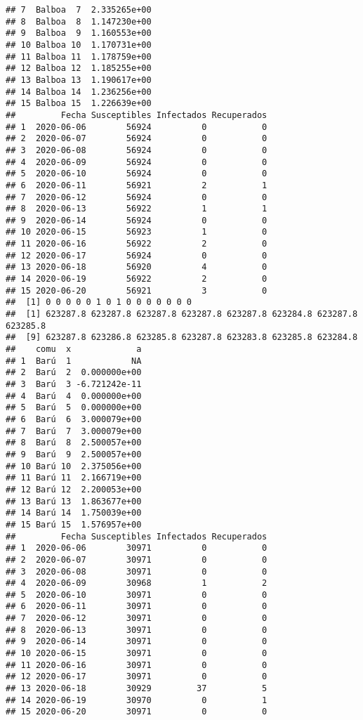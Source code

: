 \documentclass[
]{article}
\begin{document}
\begin{verbatim}
## 7  Balboa  7  2.335265e+00
## 8  Balboa  8  1.147230e+00
## 9  Balboa  9  1.160553e+00
## 10 Balboa 10  1.170731e+00
## 11 Balboa 11  1.178759e+00
## 12 Balboa 12  1.185255e+00
## 13 Balboa 13  1.190617e+00
## 14 Balboa 14  1.236256e+00
## 15 Balboa 15  1.226639e+00
##         Fecha Susceptibles Infectados Recuperados
## 1  2020-06-06        56924          0           0
## 2  2020-06-07        56924          0           0
## 3  2020-06-08        56924          0           0
## 4  2020-06-09        56924          0           0
## 5  2020-06-10        56924          0           0
## 6  2020-06-11        56921          2           1
## 7  2020-06-12        56924          0           0
## 8  2020-06-13        56922          1           1
## 9  2020-06-14        56924          0           0
## 10 2020-06-15        56923          1           0
## 11 2020-06-16        56922          2           0
## 12 2020-06-17        56924          0           0
## 13 2020-06-18        56920          4           0
## 14 2020-06-19        56922          2           0
## 15 2020-06-20        56921          3           0
##  [1] 0 0 0 0 0 1 0 1 0 0 0 0 0 0 0
##  [1] 623287.8 623287.8 623287.8 623287.8 623287.8 623284.8 623287.8 623285.8
##  [9] 623287.8 623286.8 623285.8 623287.8 623283.8 623285.8 623284.8
##    comu  x             a
## 1  Barú  1            NA
## 2  Barú  2  0.000000e+00
## 3  Barú  3 -6.721242e-11
## 4  Barú  4  0.000000e+00
## 5  Barú  5  0.000000e+00
## 6  Barú  6  3.000079e+00
## 7  Barú  7  3.000079e+00
## 8  Barú  8  2.500057e+00
## 9  Barú  9  2.500057e+00
## 10 Barú 10  2.375056e+00
## 11 Barú 11  2.166719e+00
## 12 Barú 12  2.200053e+00
## 13 Barú 13  1.863677e+00
## 14 Barú 14  1.750039e+00
## 15 Barú 15  1.576957e+00
##         Fecha Susceptibles Infectados Recuperados
## 1  2020-06-06        30971          0           0
## 2  2020-06-07        30971          0           0
## 3  2020-06-08        30971          0           0
## 4  2020-06-09        30968          1           2
## 5  2020-06-10        30971          0           0
## 6  2020-06-11        30971          0           0
## 7  2020-06-12        30971          0           0
## 8  2020-06-13        30971          0           0
## 9  2020-06-14        30971          0           0
## 10 2020-06-15        30971          0           0
## 11 2020-06-16        30971          0           0
## 12 2020-06-17        30971          0           0
## 13 2020-06-18        30929         37           5
## 14 2020-06-19        30970          0           1
## 15 2020-06-20        30971          0           0

\end{verbatim}
\end{document}
